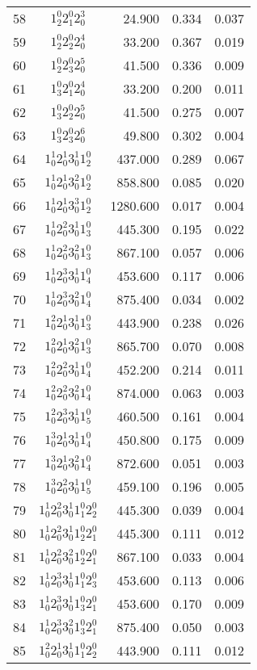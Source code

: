 \documentclass{revtex4}
\begin{document}
\begin{table}
\begin{tabular}{rcrrr}
58&$1_2^0 2_1^0 2_0^3$& 24.900& 0.334& 0.037\\
59&$1_2^0 2_2^0 2_0^4$& 33.200& 0.367& 0.019\\
60&$1_2^0 2_3^0 2_0^5$& 41.500& 0.336& 0.009\\
61&$1_3^0 2_1^0 2_0^4$& 33.200& 0.200& 0.011\\
62&$1_3^0 2_2^0 2_0^5$& 41.500& 0.275& 0.007\\
63&$1_3^0 2_3^0 2_0^6$& 49.800& 0.302& 0.004\\
64&$1_0^1 2_0^1 3_0^1 1_2^0$& 437.000& 0.289& 0.067\\
65&$1_0^1 2_0^1 3_0^2 1_2^0$& 858.800& 0.085& 0.020\\
66&$1_0^1 2_0^1 3_0^3 1_2^0$& 1280.600& 0.017& 0.004\\
67&$1_0^1 2_0^2 3_0^1 1_3^0$& 445.300& 0.195& 0.022\\
68&$1_0^1 2_0^2 3_0^2 1_3^0$& 867.100& 0.057& 0.006\\
69&$1_0^1 2_0^3 3_0^1 1_4^0$& 453.600& 0.117& 0.006\\
70&$1_0^1 2_0^3 3_0^2 1_4^0$& 875.400& 0.034& 0.002\\
71&$1_0^2 2_0^1 3_0^1 1_3^0$& 443.900& 0.238& 0.026\\
72&$1_0^2 2_0^1 3_0^2 1_3^0$& 865.700& 0.070& 0.008\\
73&$1_0^2 2_0^2 3_0^1 1_4^0$& 452.200& 0.214& 0.011\\
74&$1_0^2 2_0^2 3_0^2 1_4^0$& 874.000& 0.063& 0.003\\
75&$1_0^2 2_0^3 3_0^1 1_5^0$& 460.500& 0.161& 0.004\\
76&$1_0^3 2_0^1 3_0^1 1_4^0$& 450.800& 0.175& 0.009\\
77&$1_0^3 2_0^1 3_0^2 1_4^0$& 872.600& 0.051& 0.003\\
78&$1_0^3 2_0^2 3_0^1 1_5^0$& 459.100& 0.196& 0.005\\
79&$1_0^1 2_0^2 3_0^1 1_1^0 2_2^0$& 445.300& 0.039& 0.004\\
80&$1_0^1 2_0^2 3_0^1 1_2^0 2_1^0$& 445.300& 0.111& 0.012\\
81&$1_0^1 2_0^2 3_0^2 1_2^0 2_1^0$& 867.100& 0.033& 0.004\\
82&$1_0^1 2_0^3 3_0^1 1_1^0 2_3^0$& 453.600& 0.113& 0.006\\
83&$1_0^1 2_0^3 3_0^1 1_3^0 2_1^0$& 453.600& 0.170& 0.009\\
84&$1_0^1 2_0^3 3_0^2 1_3^0 2_1^0$& 875.400& 0.050& 0.003\\
85&$1_0^2 2_0^1 3_0^1 1_1^0 2_2^0$& 443.900& 0.111& 0.012\\

\end{tabular}
\end{table}
\end{document}
